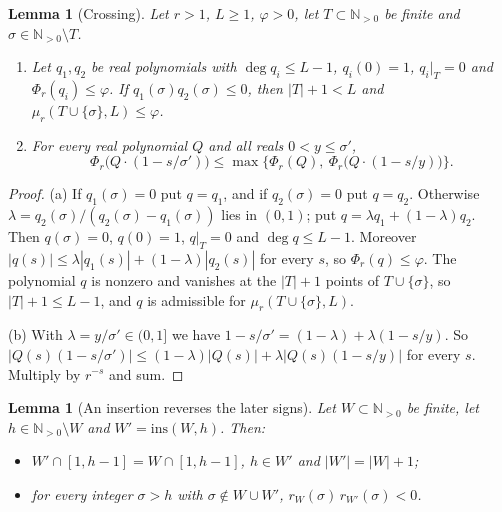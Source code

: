 \documentclass[11pt]{article}
\newtheorem{lemma}[theorem]{Lemma}
\newcommand{\N}{\mathbb N}
\begin{document}
\begin{lemma}[Crossing]\label{lem:crossing}
Let $r>1$, $L\ge1$, $\varphi>0$, let $T\subset\N_{>0}$ be finite and
$\sigma\in\N_{>0}\setminus T$.
\begin{enumerate}
\item[(a)] Let $q_1,q_2$ be real polynomials with $\deg q_i\le L-1$,
$q_i(0)=1$, $q_i|_T=0$ and $\Phi_r(q_i)\le\varphi$.  If
$q_1(\sigma)q_2(\sigma)\le0$, then $|T|+1<L$ and
$\mu_r(T\cup\{\sigma\},L)\le\varphi$.
\item[(b)] For every real polynomial $Q$ and all reals $0<y\le\sigma'$,
\[
  \Phi_r\bigl(Q\cdot(1-s/\sigma')\bigr)\le
  \max\bigl\{\Phi_r(Q),\ \Phi_r\bigl(Q\cdot(1-s/y)\bigr)\bigr\}.
\]
\end{enumerate}
\end{lemma}

\begin{proof}
(a) If $q_1(\sigma)=0$ put $q=q_1$, and if $q_2(\sigma)=0$ put $q=q_2$.
Otherwise $\lambda=q_2(\sigma)/(q_2(\sigma)-q_1(\sigma))$ lies in $(0,1)$;
put $q=\lambda q_1+(1-\lambda)q_2$.  Then $q(\sigma)=0$, $q(0)=1$, $q|_T=0$
and $\deg q\le L-1$.  Moreover
$|q(s)|\le\lambda|q_1(s)|+(1-\lambda)|q_2(s)|$ for every $s$, so
$\Phi_r(q)\le\varphi$.  The polynomial $q$ is nonzero and vanishes at the
$|T|+1$ points of $T\cup\{\sigma\}$, so $|T|+1\le L-1$, and $q$ is admissible
for $\mu_r(T\cup\{\sigma\},L)$.

(b) With $\lambda=y/\sigma'\in(0,1]$ we have
$1-s/\sigma'=(1-\lambda)+\lambda(1-s/y)$.  So
$|Q(s)(1-s/\sigma')|\le(1-\lambda)|Q(s)|+\lambda|Q(s)(1-s/y)|$ for every $s$.
Multiply by $r^{-s}$ and sum.
\end{proof}

\begin{lemma}[An insertion reverses the later signs]\label{lem:insflip}
Let $W\subset\N_{>0}$ be finite, let $h\in\N_{>0}\setminus W$ and
$W'=\mathrm{ins}(W,h)$.  Then:
\begin{itemize}
\item $W'\cap[1,h-1]=W\cap[1,h-1]$, $h\in W'$ and $|W'|=|W|+1$;
\item for every integer $\sigma>h$ with $\sigma\notin W\cup W'$,
$r_W(\sigma)\,r_{W'}(\sigma)<0$.
\end{itemize}
\end{lemma}
\end{document}

